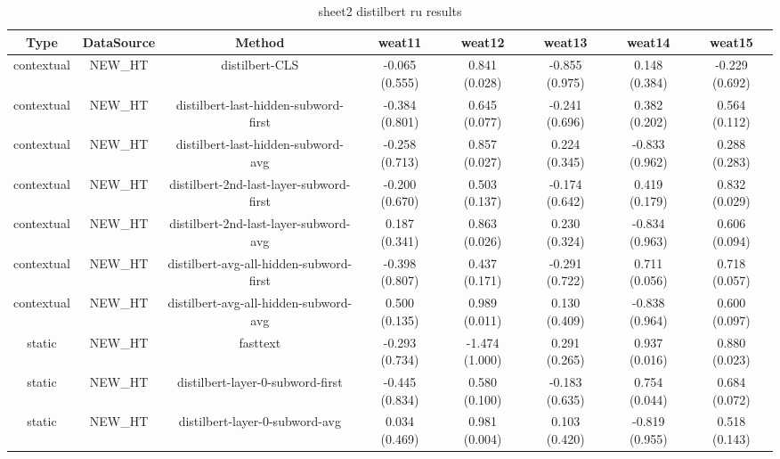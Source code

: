 \begin{sidewaystable}[htb]
    \centering
    \caption{sheet2 distilbert ru results}
    \label{appendix_tab:sheet2_distilbert_ru_results}
    \small
    \begin{tabular}{@{}cccccccc@{}}
        \toprule
        Type & DataSource & Method & weat11 & weat12 & weat13 & weat14 & weat15 \\
        \midrule
        contextual & NEW\_HT & distilbert-CLS & -0.065 (0.555) & 0.841 (0.028) & -0.855 (0.975) & 0.148 (0.384) & -0.229 (0.692) \\
        contextual & NEW\_HT & distilbert-last-hidden-subword-first & -0.384 (0.801) & 0.645 (0.077) & -0.241 (0.696) & 0.382 (0.202) & 0.564 (0.112) \\
        contextual & NEW\_HT & distilbert-last-hidden-subword-avg & -0.258 (0.713) & 0.857 (0.027) & 0.224 (0.345) & -0.833 (0.962) & 0.288 (0.283) \\
        contextual & NEW\_HT & distilbert-2nd-last-layer-subword-first & -0.200 (0.670) & 0.503 (0.137) & -0.174 (0.642) & 0.419 (0.179) & 0.832 (0.029) \\
        contextual & NEW\_HT & distilbert-2nd-last-layer-subword-avg & 0.187 (0.341) & 0.863 (0.026) & 0.230 (0.324) & -0.834 (0.963) & 0.606 (0.094) \\
        contextual & NEW\_HT & distilbert-avg-all-hidden-subword-first & -0.398 (0.807) & 0.437 (0.171) & -0.291 (0.722) & 0.711 (0.056) & 0.718 (0.057) \\
        contextual & NEW\_HT & distilbert-avg-all-hidden-subword-avg & 0.500 (0.135) & 0.989 (0.011) & 0.130 (0.409) & -0.838 (0.964) & 0.600 (0.097) \\
        static & NEW\_HT & fasttext & -0.293 (0.734) & -1.474 (1.000) & 0.291 (0.265) & 0.937 (0.016) & 0.880 (0.023) \\
        static & NEW\_HT & distilbert-layer-0-subword-first & -0.445 (0.834) & 0.580 (0.100) & -0.183 (0.635) & 0.754 (0.044) & 0.684 (0.072) \\
        static & NEW\_HT & distilbert-layer-0-subword-avg & 0.034 (0.469) & 0.981 (0.004) & 0.103 (0.420) & -0.819 (0.955) & 0.518 (0.143) \\
        \bottomrule
    \end{tabular}
\end{sidewaystable}